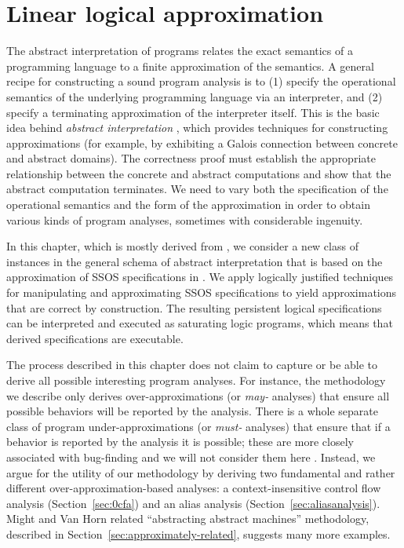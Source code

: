 \chapter{Linear logical approximation}
\label{chapter-approx}

The abstract interpretation of programs relates the exact semantics of
a programming language to a finite approximation of the semantics. A
general recipe for constructing a sound program analysis is to (1)
specify the operational semantics of the underlying programming
language via an interpreter, and (2) specify a terminating
approximation of the interpreter itself. This is the basic idea behind
{\it abstract interpretation} \cite{cousot77abstract}, which provides
techniques for constructing approximations (for example, by exhibiting
a Galois connection between concrete and abstract domains). The
correctness proof must establish the appropriate relationship between
the concrete and abstract computations and show that the abstract
computation terminates. We need to vary both the specification of
the operational semantics and the form of the approximation in order
to obtain various kinds of program analyses, sometimes with
considerable ingenuity.

In this chapter, which is mostly derived from \cite{simmons11logical},
we consider a new class of instances in the general schema of abstract
interpretation that is based on the approximation of SSOS
specifications in \sls. We apply logically justified techniques for
manipulating and approximating SSOS specifications to yield
approximations that are correct by construction. The resulting
persistent logical specifications can be interpreted and executed as
saturating logic programs, which means that derived specifications
are executable.

The process described in this chapter does not claim to capture or be
able to derive all possible interesting program analyses. For
instance, the methodology we describe only derives over-approximations
(or {\it may-} analyses) that ensure all possible behaviors will be
reported by the analysis. There is a whole separate class of program
under-approximations (or {\it must-} analyses) that ensure that if a
behavior is reported by the analysis it is possible; these are more
closely associated with bug-finding and we will not consider them here
\cite{godefroid10compositional}. Instead, we argue for the utility of
our methodology by deriving two fundamental and rather different
over-approximation-based analyses: a context-insensitive control flow
analysis (Section~\ref{sec:0cfa}) and an alias analysis
(Section~\ref{sec:aliasanalysis}). Might and Van Horn related
``abstracting abstract machines'' methodology, described in
Section~\ref{sec:approximately-related}, suggests many more examples.

